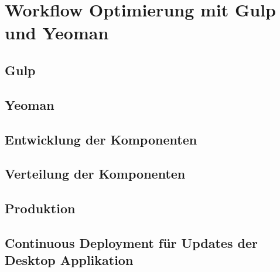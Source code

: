 
\chapter{Workflow Optimierung mit Gulp und Yeoman}

\section{Gulp}
\section{Yeoman}

\section{Entwicklung der Komponenten}


\section{Verteilung der Komponenten}

\section{Produktion}

\section{Continuous Deployment für Updates der Desktop Applikation}
